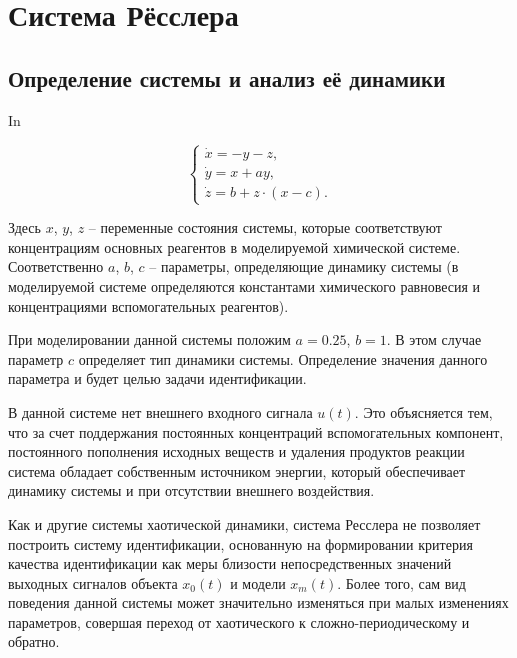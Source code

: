 
\FloatBarrier
\section{Система Рёсслера} %
\label{atu:sect:ross}


\subsection{Определение системы и анализ её динамики} %

In~\cite{neimark_stoch_chaos_vibro,koltsova_nl_dyn_chem,berje_order_in_chaos,chulichkcov_mm_ml_dyn}

\begin{equation}
\begin{cases}
  \dot{x}  = -y - z  ,  \\
  \dot{y}  = x + a y ,\\
  \dot{z}  = b + z \cdot ( x-c ) .
\end{cases}
\label{atu:eq:rossler}
\end{equation}

Здесь \(x\), \(y\), \(z\) -- переменные состояния системы,
которые соответствуют концентрациям основных реагентов
в моделируемой химической системе.
Соответственно \(a\), \(b\), \(c\) --
параметры, определяющие динамику системы
(в моделируемой системе определяются константами химического равновесия
и концентрациями вспомогательных реагентов).

При моделировании данной системы положим
\(a=0.25\), \(b=1\).
В этом случае параметр \(c\) определяет
тип динамики системы.
Определение значения данного параметра и будет
целью задачи идентификации.

В данной системе нет внешнего входного сигнала \( u(t) \).
Это объясняется тем, что за счет
поддержания постоянных концентраций вспомогательных
компонент, постоянного пополнения исходных веществ
и удаления продуктов реакции система обладает
собственным источником энергии, который обеспечивает
динамику системы и при отсутствии
внешнего воздействия.

Как и другие системы хаотической динамики, система Ресслера
не позволяет построить систему идентификации, основанную
на формировании критерия качества идентификации
как меры близости непосредственных значений выходных сигналов
объекта \( x_0(t) \) и модели \( x_m(t) \).
Более того, сам вид поведения данной системы может значительно изменяться
при малых изменениях параметров, совершая переход от
хаотического к сложно-периодическому и обратно.

